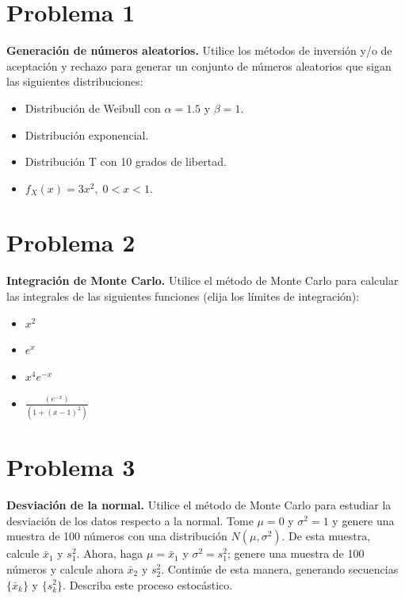 \documentclass[12pt]{article}
\begin{document}
\section*{Problema 1}
    
    \textbf{Generación de números aleatorios.} Utilice los métodos de inversión y/o de aceptación y rechazo para generar un conjunto de números aleatorios que sigan las siguientes distribuciones:
    \begin{itemize}
        \item Distribución de Weibull con $\alpha = 1.5$ y $\beta = 1$.
        \item Distribución exponencial.
        \item Distribución T con 10 grados de libertad.
        \item $f_X(x) = 3x^2, \; 0 < x < 1$.
    \end{itemize}
    
\section*{Problema 2}
    \textbf{Integración de Monte Carlo.} Utilice el método de Monte Carlo para calcular las integrales de las siguientes funciones (elija los límites de integración):
    \begin{itemize}
        \item $x^2$
        \item $e^x$
        \item $x^4 e^{-x}$
        \item $\frac{(e^{-x})}{(1 + (x - 1)^2)}$
    \end{itemize}

\section*{Problema 3}
    \textbf{Desviación de la normal.} Utilice el método de Monte Carlo para estudiar la desviación de los datos respecto a la normal. Tome $\mu = 0$ y $\sigma^2 = 1$ y genere una muestra de 100 números con una distribución $N(\mu, \sigma^2)$. De esta muestra, calcule $\bar{x}_1$ y $s_1^2$. Ahora, haga $\mu = \bar{x}_1$ y $\sigma^2 = s_1^2$; genere una muestra de 100 números y calcule ahora $\bar{x}_2$ y $s_2^2$. Continúe de esta manera, generando secuencias $\{\bar{x}_k\}$ y $\{s_k^2\}$. Describa este proceso estocástico.
\end{document}
